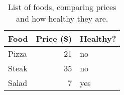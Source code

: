 \begin{table}[ht]
    \centering
    \begin{tabular}{@{}lrl@{}}
    \toprule
    Food  & Price (\$) & Healthy? \\
    \midrule
    Pizza & 21         & no       \\
    Steak & 35         & no       \\
    Salad & 7          & yes      \\
    \bottomrule
    \end{tabular}
    \caption{List of foods, comparing prices and how healthy they are.}
    \label{tab:foods}
\end{table}